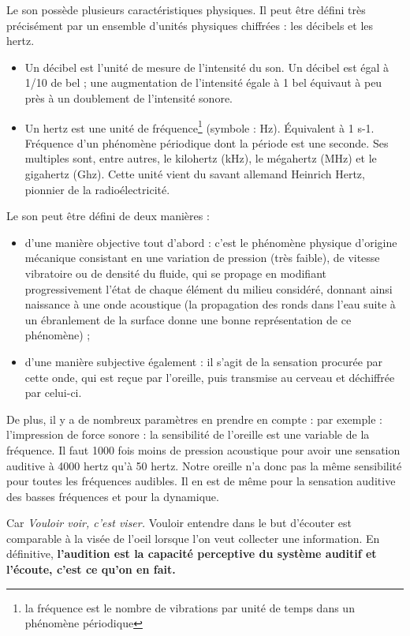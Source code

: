 Le son possède plusieurs caractéristiques physiques. Il peut être
défini très précisément par un ensemble d'unités physiques chiffrées
: les décibels et les hertz. 
\begin{itemize}
	\item Un décibel est l'unité de mesure de l'intensité du son. Un décibel
	est égal à 1/10 de bel ; une augmentation de l'intensité égale à 1
	bel équivaut à peu près à un doublement de l'intensité sonore. 
	\item Un hertz est une unité de fréquence\footnote{la fréquence est le nombre de vibrations par unité de temps dans un
		phénomène périodique} (symbole : Hz). Équivalent à 1 s-1. Fréquence d'un phénomène périodique
	dont la période est une seconde. Ses multiples sont, entre autres,
	le kilohertz (kHz), le mégahertz (MHz) et le gigahertz (Ghz). Cette
	unité vient du savant allemand Heinrich Hertz, pionnier de la radioélectricité.
\end{itemize}
Le son peut être défini de deux manières : 
\begin{itemize}
	\item d'une manière objective tout d'abord : c'est le phénomène physique
	d'origine mécanique consistant en une variation de pression (très
	faible), de vitesse vibratoire ou de densité du fluide, qui se propage
	en modifiant progressivement l'état de chaque élément du milieu considéré,
	donnant ainsi naissance à une onde acoustique (la propagation des
	ronds dans l'eau suite à un ébranlement de la surface donne une bonne
	représentation de ce phénomène) ; 
	\item d'une manière subjective également : il s'agit de la sensation procurée
	par cette onde, qui est reçue par l'oreille, puis transmise au cerveau
	et déchiffrée par celui-ci.
\end{itemize}
De plus, il y a de nombreux paramètres en prendre en compte : par
exemple : l'impression de force sonore : la sensibilité de l'oreille
est une variable de la fréquence. Il faut 1000 fois moins de pression
acoustique pour avoir une sensation auditive à 4000 hertz qu'à 50
hertz. Notre oreille n'a donc pas la même sensibilité pour toutes
les fréquences audibles. Il en est de même pour la sensation auditive
des basses fréquences et pour la dynamique. 




Car \emph{Vouloir voir, c'est viser.}  Vouloir entendre dans le but d'écouter est comparable  à
la visée de l'oeil lorsque l'on veut collecter une information.  
En définitive,\textbf{ l'audition est la capacité perceptive du système auditif et l'écoute, c'est ce qu'on en fait.}

